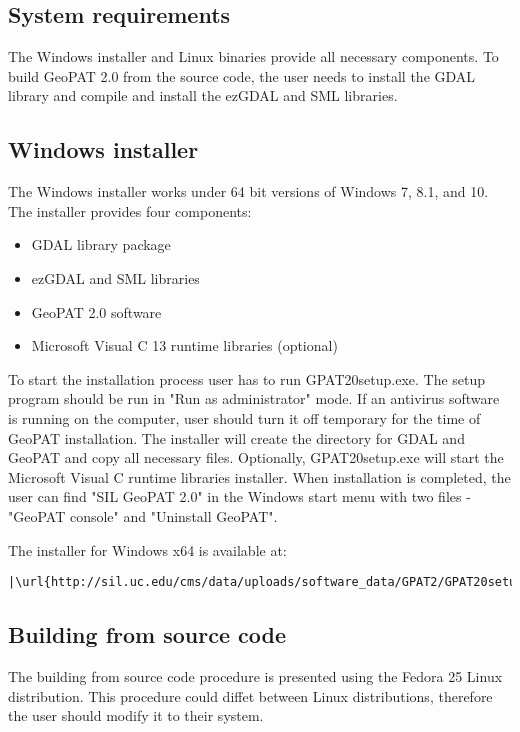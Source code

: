 \subsection{System requirements}

The Windows installer and Linux binaries provide all necessary components. 
To build GeoPAT 2.0 from the source code, the user needs to install the GDAL library and compile and install the ezGDAL and SML libraries.

\subsection{Windows installer}
The Windows installer works under 64 bit versions of Windows 7, 8.1, and 10.
The installer provides four components:
\begin{itemize}
  \item{GDAL library package}
  \item{ezGDAL and SML libraries}
  \item{GeoPAT 2.0 software}
  \item{Microsoft Visual C 13 runtime libraries (optional)}
\end{itemize}
To start the installation process user has to run GPAT20setup.exe.
The setup program should be run in "Run as administrator" mode.
If an antivirus software is running on the computer, user should turn it off temporary for the time of GeoPAT installation.
The installer will create the directory for GDAL and GeoPAT and copy all necessary files.
Optionally, GPAT20setup.exe will start the Microsoft Visual C runtime libraries installer.
When installation is completed, the user can find "SIL GeoPAT 2.0" in the Windows start menu with two files - "GeoPAT console" and "Uninstall GeoPAT".

The installer for Windows x64 is available at:

\begin{lstlisting}[escapechar=|]
|\url{http://sil.uc.edu/cms/data/uploads/software_data/GPAT2/GPAT20setup.exe}|
\end{lstlisting}

\subsection{Building from source code}

The building from source code procedure is presented using the Fedora 25 Linux distribution.
This procedure could diffet between Linux distributions, therefore the user should modify it to their system.

